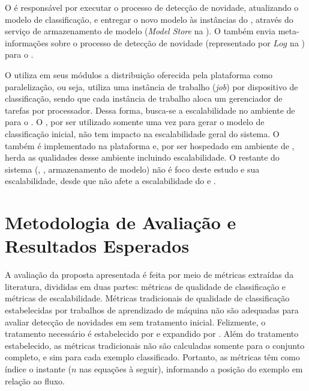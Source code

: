 O \detector é responsável por executar o processo de detecção de novidade,
atualizando o modelo de classificação, e entregar o novo modelo às instâncias do
\classify, através do serviço de armazenamento de modelo (\emph{Model Store} na
).
O \detector também envia meta-informações sobre o processo de detecção de
novidade (representado por $Log$ na ) para o \sink.


O \mfog utiliza em seus módulos a distribuição oferecida pela plataforma \flink
como paralelização, ou seja, utiliza uma instância de trabalho (\emph{job}) por
dispositivo de classificação, sendo que cada instância de trabalho aloca um
gerenciador de tarefas por processador.
Dessa forma, busca-se a escalabilidade no ambiente de \fog para o \classify.
O \offline, por ser utilizado somente uma vez para gerar o modelo
de classificação inicial, não tem impacto na escalabilidade geral do sistema.
O \detector também é implementado na plataforma \flink e, por ser hospedado em
ambiente de \cloud, herda as qualidades desse ambiente incluindo escalabilidade.
O restante do sistema (\source, \sink, armazenamento de modelo) não é foco deste
estudo e sua escalabilidade, desde que não afete a escalabilidade do \classify e
\detector.

\section{Metodologia de Avaliação e Resultados Esperados}\label{sec:esperados}


A avaliação da proposta apresentada é feita por meio de métricas extraídas da
literatura, divididas em duas partes: métricas de qualidade de classificação
e métricas de escalabilidade.
Métricas tradicionais de qualidade de classificação estabelecidas por trabalhos
de aprendizado de máquina não são adequadas para avaliar detecção de novidades em
\streams sem tratamento inicial. Felizmente, o tratamento necessário é
estabelecido por  e expandido por
.
Além do tratamento estabelecido, as métricas tradicionais não são calculadas
somente para o conjunto completo, e sim para cada exemplo classificado.
Portanto, as métricas têm como índice o instante ($n$ nas equações à seguir),
informando a posição do exemplo em relação ao fluxo.

